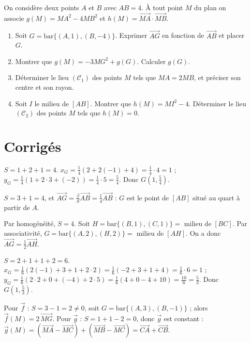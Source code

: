 On considère deux points $A$ et $B$ avec $AB=4$. À tout point $M$ du plan on associe
$g(M)=MA^2-4MB^2$ et $h(M)=\overrightarrow{MA}\cdot\overrightarrow{MB}$.
\begin{enumerate}[label=\arabic*)]
\item Soit $G=\mathrm{bar}\{(A,1),(B,-4)\}$. Exprimer $\overrightarrow{AG}$ en fonction de $\overrightarrow{AB}$ et placer $G$.
\item Montrer que $g(M)=-3MG^2+g(G)$. Calculer $g(G)$.
\item Déterminer le lieu $(\mathcal C_1)$ des points $M$ tels que $MA=2MB$, et préciser son centre et son rayon.
\item Soit $I$ le milieu de $[AB]$. Montrer que $h(M)=MI^2-4$. Déterminer le lieu $(\mathcal C_2)$ des points $M$ tels que $h(M)=0$.
\end{enumerate}

\section{Corrigés}

$S=1+2+1=4$. $x_G=\frac14(2+2(-1)+4)=\frac14\cdot4=1$ ; $y_G=\frac14(1+2\cdot3+(-2))=\frac14\cdot5=\frac54$. Donc $G\!\left(1,\frac54\right)$.

$S=3+1=4$, et $\overrightarrow{AG}=\frac{\beta}{S}\overrightarrow{AB}=\frac14\overrightarrow{AB}$ : $G$ est le point de $[AB]$ situé au quart à partir de $A$.

Par homogénéité, $S=4$. Soit $H=\mathrm{bar}\{(B,1),(C,1)\}=$ milieu de $[BC]$. Par associativité, $G=\mathrm{bar}\{(A,2),(H,2)\}=$ milieu de $[AH]$. On a donc $\overrightarrow{AG}=\frac12\overrightarrow{AH}$.

$S=2+1+1+2=6$. $x_G=\frac16(2(-1)+3+1+2\cdot2)=\frac16(-2+3+1+4)=\frac16\cdot6=1$ ;
$y_G=\frac16(2\cdot2+0+(-4)+2\cdot5)=\frac16(4+0-4+10)=\frac{10}{6}=\frac53$. Donc $G\!\left(1,\frac53\right)$.

Pour $\vec f$ : $S=3-1=2\neq0$, soit $G=\mathrm{bar}\{(A,3),(B,-1)\}$ ; alors $\vec f(M)=2\,\overrightarrow{MG}$.
Pour $\vec g$ : $S=1+1-2=0$, donc $\vec g$ est constant : $\vec g(M)=(\overrightarrow{MA}-\overrightarrow{MC})+(\overrightarrow{MB}-\overrightarrow{MC})=\overrightarrow{CA}+\overrightarrow{CB}$.

